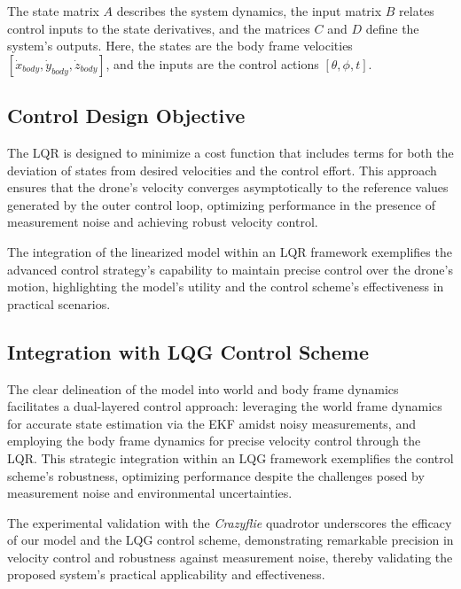 The state matrix \(A\) describes the system dynamics, the input matrix \(B\) relates control inputs to the state derivatives, and the matrices \(C\) and \(D\) define the system's outputs. Here, the states are the body frame velocities \([\dot{x}_{body}, \dot{y}_{body}, \dot{z}_{body}]\), and the inputs are the control actions \([\theta, \phi, t]\).

\subsection{Control Design Objective}

The LQR is designed to minimize a cost function that includes terms for both the deviation of states from desired velocities and the control effort. This approach ensures that the drone's velocity converges asymptotically to the reference values generated by the outer control loop, optimizing performance in the presence of measurement noise and achieving robust velocity control.

The integration of the linearized model within an LQR framework exemplifies the advanced control strategy's capability to maintain precise control over the drone's motion, highlighting the model's utility and the control scheme's effectiveness in practical scenarios.


\subsection{Integration with LQG Control Scheme}

The clear delineation of the model into world and body frame dynamics facilitates a dual-layered control approach: leveraging the world frame dynamics for accurate state estimation via the EKF amidst noisy measurements, and employing the body frame dynamics for precise velocity control through the LQR. This strategic integration within an LQG framework exemplifies the control scheme's robustness, optimizing performance despite the challenges posed by measurement noise and environmental uncertainties.

The experimental validation with the \emph{Crazyflie} quadrotor underscores the efficacy of our model and the LQG control scheme, demonstrating remarkable precision in velocity control and robustness against measurement noise, thereby validating the proposed system's practical applicability and effectiveness.